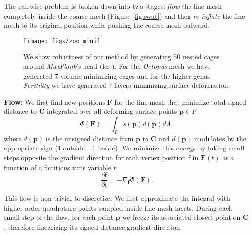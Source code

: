 \documentclass{cgyrf15}
\begin{document}
The pairwise problem is broken down into two stages: \emph{flow} the fine mesh
completely inside the coarse mesh  (Figure~\ref{fig:swat}) and then \emph{re-inflate} the
fine mesh to its original position while pushing the coarse mesh outward.

\begin{figure*}[t]
  \texttt{[image: figs/zoo\_mini]}
  \caption{We show robustness of our method by generating 50 nested cages
  around \emph{MaxPlank}'s head (left). For the \emph{Octopus} mesh we have
  generated 7 volume minimizing cages and for the higher-genus
  \emph{Feritility} we have generated 7 layers minimizing surface deformation.
  }
  \label{fig:minizoo}
\end{figure*}

\noindent \textbf{Flow:} We first find new positions $\mathbf{F}$ for the fine
mesh that minimize total signed distance to $\mathbf{C}$ integrated over all
deforming surface points $\textbf{p} \in F$ \begin{equation}
\Phi(\mathbf{F}) = \int_F s(\mathbf{p})
d(\mathbf{p}) dA, \label{eq:flow_energy} \end{equation} where
$d(\mathbf{p})$ is the unsigned distance from $\mathbf{p}$ to $\mathbf{C} $
and $d(\mathbf{p})$ modulates by the appropriate sign
($1$ outside $-1$ inside). We minimize this energy by taking small steps opposite the gradient direction
for each vertex position $\mathbf{f}$ in $\mathbf{F}(t)$
as a function of a fictitious time variable $t$:
\begin{equation}
\frac{\partial \mathbf{f}}{\partial t} = - \nabla_{\mathbf{f}} \Phi(\mathbf{F}).
\label{eq:energy_gradient}
\end{equation}


This flow is non-trivial to discretize. We first approximate the integral with
higher-order quadrature points sampled inside fine mesh facets. 
During each small step of the flow,
for each point $\textbf{p}$ we freeze its associated closest point
on $\mathbf{C}$, therefore linearizing its signed distance gradient direction. 
\end{document}
